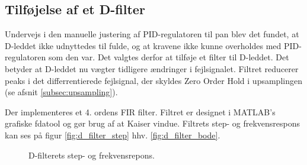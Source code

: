 \subsection{Tilføjelse af et D-filter}
Undervejs i den manuelle justering af PID-regulatoren til pan blev det fundet, at D-leddet ikke udnyttedes til fulde,
og at kravene ikke kunne overholdes med PID-regulatoren som den var.
Det valgtes derfor at tilføje et filter til D-leddet. 
Det betyder at D-leddet nu vægter tidligere ændringer i fejlsignalet. 
Filtret reducerer peaks i det differrentierede fejlsignal, der skyldes Zero Order Hold i upsamplingen (se afsnit \ref{subsec:upsampling}).

Der implementeres et 4. ordens FIR filter. Filtret er designet i MATLAB's grafiske fdatool og gør brug af at Kaiser vindue.
Filtrets step- og frekvensrespons kan ses på figur \ref{fig:d_filter_step} hhv. \ref{fig:d_filter_bode}. 

\begin{figure}[h!]
\centering
{}
\caption[D-filterets respons]{D-filterets step- og frekvensrepons.}
\label{fig:d_filter}
\end{figure}

